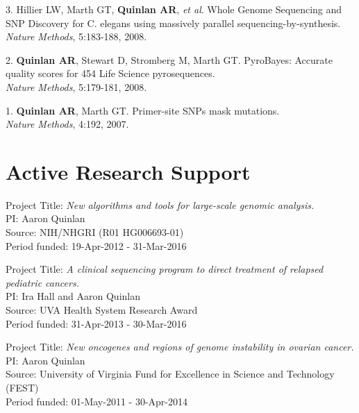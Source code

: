 \documentclass[margin,line]{cv}
\begin{document}
\begin{resume}
\begin{list}{*}{}
    \item[3.] Hillier LW, Marth GT, \textbf{Quinlan AR}, \textit{et al}.
    Whole Genome Sequencing and SNP Discovery for C. elegans using massively parallel sequencing-by-synthesis.\\
    \textit{Nature Methods}, 5:183-188, 2008.

    \item[2.] \textbf{Quinlan AR}, Stewart D, Stromberg M, Marth GT.
    PyroBayes: Accurate quality scores for 454 Life Science pyrosequences.\\
    \textit{Nature Methods}, 5:179-181, 2008.

    \item[1.] \textbf{Quinlan AR}, Marth GT.
    Primer-site SNPs mask mutations.\\
    \textit{Nature Methods}, 4:192, 2007.

    \end{list}



    \section{\mysidestyle Active Research Support}

    Project Title: \textit{New algorithms and tools for large-scale genomic analysis.} \\
    PI: Aaron Quinlan \\
    Source: NIH/NHGRI (R01 HG006693-01) \\
    Period funded: 19-Apr-2012 - 31-Mar-2016

    Project Title: \textit{A clinical sequencing program to direct treatment of relapsed pediatric cancers.} \\
    PI: Ira Hall and Aaron Quinlan \\
    Source: UVA Health System Research Award  \\
    Period funded: 31-Apr-2013 - 30-Mar-2016

    \vspace{-2mm}
    Project Title: \textit{New oncogenes and regions of genome instability in ovarian cancer.} \\
    PI: Aaron Quinlan \\
    Source: University of Virginia Fund for Excellence in Science and Technology (FEST) \\
    Period funded: 01-May-2011 - 30-Apr-2014


\end{resume}
\end{document}
